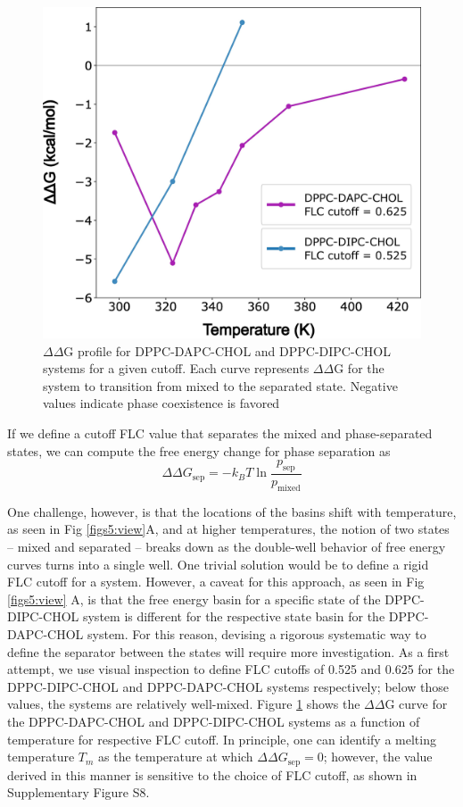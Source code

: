 \documentclass{biophys-new}
\begin{document}
\begin{figure}[hbt!]
\centering
\includegraphics[width=0.5\linewidth]{Figures/Main/7/placeholder.jpg}
\caption{$\Delta\Delta$G profile for DPPC-DAPC-CHOL and DPPC-DIPC-CHOL systems for a given cutoff. Each curve represents $\Delta\Delta$G for the system to transition from mixed to the separated state. Negative values indicate phase coexistence is favored}
\label{figs7:view}
\end{figure}

If we define a cutoff FLC value that separates the mixed and phase-separated states, we can compute the free energy change for phase separation as 
\begin{equation}
    \Delta \Delta G_{\text{sep}} = -k_B T \ln \frac{p_{\text{sep}}}{p_{\text{mixed}}}
\end{equation}

One challenge, however, is that the locations of the basins shift with temperature, as seen in Fig \ref{figs5:view}A, and
at higher temperatures, the notion of two states -- mixed and separated -- breaks down as the double-well behavior of free energy curves turns into a single well. 
One trivial solution would be to define a rigid FLC cutoff for a system.
However, a caveat for this approach, as seen in Fig \ref{figs5:view} A, is that the free energy basin for a specific state of the DPPC-DIPC-CHOL system is different for the respective state basin for the DPPC-DAPC-CHOL system.
For this reason, devising a rigorous systematic way to define the separator between the states will require more investigation. As a first attempt, we use visual inspection to define FLC cutoffs of 0.525 and 0.625 for the DPPC-DIPC-CHOL and DPPC-DAPC-CHOL systems respectively; below those values, the systems are relatively well-mixed.
Figure \ref{figs7:view} shows the $\Delta\Delta$G curve for the DPPC-DAPC-CHOL and DPPC-DIPC-CHOL systems as a function of temperature for respective FLC cutoff. In principle, one can identify a melting temperature $T_m$ as the temperature at which $\Delta\Delta G_{\text{sep}}=0$; however, the value derived
in this manner is sensitive to the choice of FLC cutoff, as shown in Supplementary Figure S8.
\end{document}
